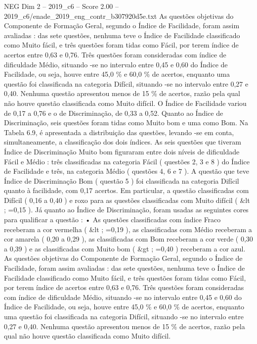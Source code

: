 \begin{textsample}{NEG Dim 2 – 2019\_c6 – Score 2.00 – 2019\_c6/enade\_2019\_eng\_contr\_b307920d5e.txt}
As questões objetivas do Componente de Formação Geral, segundo o Índice de Facilidade, foram assim avaliadas : das sete questões, nenhuma teve o Índice de Facilidade classificado como Muito fácil, e três questões foram tidas como Fácil, por terem índice de acertos entre 0,63 e 0,76.
Três questões foram consideradas com índice de dificuldade Médio, situando -se no intervalo entre 0,45 e 0,60 do Índice de Facilidade, ou seja, houve entre 45,0 \% e 60,0 \% de acertos, enquanto uma questão foi classificada na categoria Difícil, situando -se no intervalo entre 0,27 e 0,40.
Nenhuma questão apresentou menos de 15 \% de acertos, razão pela qual não houve questão classificada como Muito difícil.
O Índice de Facilidade variou de 0,17 a 0,76 e o de Discriminação, de 0,33 a 0,52.
Quanto ao Índice de Discriminação, seis questões foram tidas como Muito bom e uma como Bom.
Na Tabela 6.9, é apresentada a distribuição das questões, levando -se em conta, simultaneamente, a classificação dos dois índices.
As seis questões que tiveram Índice de Discriminação Muito bom figuraram entre dois níveis de dificuldade Fácil e Médio : três classificadas na categoria Fácil ( questões 2, 3 e 8 ) do Índice de Facilidade e três, na categoria Médio ( questões 4, 6 e 7 ).
A questão que teve Índice de Discriminação Bom ( questão 5 ) foi classificada na categoria Difícil quanto à facilidade, com 0,17 acertos.
Em particular, a questão classificadas com Difícil ( 0,16 a 0,40 ) e roxo para as questões classificadas com Muito difícil ( \&lt ; =0,15 ).
Já quanto ao Índice de Discriminação, foram usadas as seguintes cores para qualificar a questão : • As questões classificadas com índice Fraco receberam a cor vermelha ( \&lt ; =0,19 ), as classificadas com Médio receberam a cor amarela ( 0,20 a 0,29 ), as classificadas com Bom receberam a cor verde ( 0,30 a 0,39 ) e as classificadas com Muito bom ( \&gt ; =0,40 ) receberam a cor azul.
As questões objetivas do Componente de Formação Geral, segundo o Índice de Facilidade, foram assim avaliadas : das sete questões, nenhuma teve o Índice de Facilidade classificado como Muito fácil, e três questões foram tidas como Fácil, por terem índice de acertos entre 0,63 e 0,76.
Três questões foram consideradas com índice de dificuldade Médio, situando -se no intervalo entre 0,45 e 0,60 do Índice de Facilidade, ou seja, houve entre 45,0 \% e 60,0 \% de acertos, enquanto uma questão foi classificada na categoria Difícil, situando -se no intervalo entre 0,27 e 0,40.
Nenhuma questão apresentou menos de 15 \% de acertos, razão pela qual não houve questão classificada como Muito difícil.

\end{textsample}
